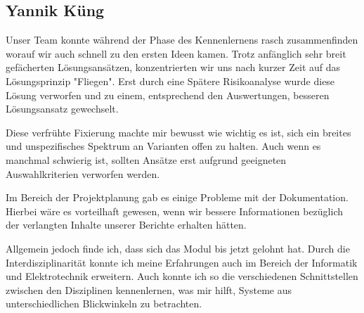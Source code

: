 \subsection*{Yannik Küng}
Unser Team konnte während der Phase des Kennenlernens rasch zusammenfinden worauf wir auch schnell zu den ersten Ideen kamen. Trotz anfänglich sehr breit gefächerten Lösungsansätzen, konzentrierten wir uns nach kurzer Zeit auf das Lösungsprinzip "Fliegen". Erst durch eine Spätere Risikoanalyse wurde diese Lösung verworfen und zu einem, entsprechend den Auswertungen, besseren Lösungsansatz gewechselt.

Diese verfrühte Fixierung machte mir bewusst wie wichtig es ist, sich ein breites und unspezifisches Spektrum an Varianten offen zu halten. Auch wenn es manchmal schwierig ist, sollten Ansätze erst aufgrund geeigneten Auswahlkriterien verworfen werden.

Im Bereich der Projektplanung gab es einige Probleme mit der Dokumentation. Hierbei wäre es vorteilhaft gewesen, wenn wir bessere Informationen bezüglich der verlangten Inhalte unserer Berichte erhalten hätten.

Allgemein jedoch finde ich, dass sich das Modul bis jetzt gelohnt hat. Durch die Interdisziplinarität konnte ich meine Erfahrungen auch im Bereich der Informatik und Elektrotechnik erweitern. Auch konnte ich so die verschiedenen Schnittstellen zwischen den Disziplinen kennenlernen, was mir hilft, Systeme aus unterschiedlichen Blickwinkeln zu betrachten.

